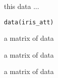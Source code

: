 \begin{Description}\relax
this data ...
\end{Description}
\begin{Usage}
\begin{verbatim}data(iris_att)\end{verbatim}
\end{Usage}
\begin{Format}\relax
a matrix of data
\end{Format}
\begin{Source}\relax
a matrix of data
\end{Source}
\begin{References}\relax
a matrix of data
\end{References}

